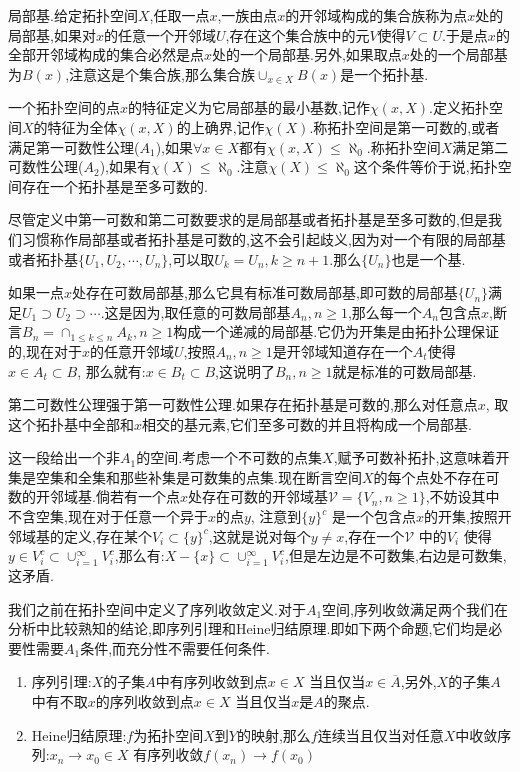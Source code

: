 局部基.给定拓扑空间$X$,任取一点$x$,一族由点$x$的开邻域构成的集合族称为点$x$处的局部基,如果对$x$的任意一个开邻域$U$,存在这个集合族中的元$V$使得$V\subset U$.于是点$x$的全部开邻域构成的集合必然是点$x$处的一个局部基.另外,如果取点$x$处的一个局部基为$B(x)$,注意这是个集合族,那么集合族$\cup_{x\in X}B(x)$是一个拓扑基.

一个拓扑空间的点$x$的特征定义为它局部基的最小基数,记作$\chi(x,X)$.定义拓扑空间$X$的特征为全体$\chi(x,X)$的上确界,记作$\chi(X)$.称拓扑空间是第一可数的,或者满足第一可数性公理($A_1$),如果$\forall x\in X$都有$\chi(x,X)\le\aleph_0$.称拓扑空间$X$满足第二可数性公理($A_2$),如果有$\chi(X)\le\aleph_0$.注意$\chi(X)\le\aleph_0$这个条件等价于说,拓扑空间存在一个拓扑基是至多可数的.

尽管定义中第一可数和第二可数要求的是局部基或者拓扑基是至多可数的,但是我们习惯称作局部基或者拓扑基是可数的,这不会引起歧义,因为对一个有限的局部基或者拓扑基$\{U_1,U_2,\cdots,U_n\}$,可以取$U_{k}=U_n,k\ge n+1$.那么$\{U_n\}$也是一个基.

如果一点$x$处存在可数局部基,那么它具有标准可数局部基,即可数的局部基$\{U_n\}$满足$U_1\supset U_2\supset\cdots$.这是因为,取任意的可数局部基$A_n,n\ge1$,那么每一个$A_n$包含点$x$,断言$B_n=\cap_ {1\le k\le n}A_k,n\ge1$构成一个递减的局部基.它仍为开集是由拓扑公理保证的,现在对于$x$的任意开邻域$U$,按照$A_n,n\ge1$是开邻域知道存在一个$A_t$使得$x\in A_t\subset B$, 那么就有:$x\in B_t\subset B$,这说明了$B_n,n\ge1$就是标准的可数局部基.

第二可数性公理强于第一可数性公理.如果存在拓扑基是可数的,那么对任意点$x$, 取这个拓扑基中全部和$x$相交的基元素,它们至多可数的并且将构成一个局部基.

这一段给出一个非$A_1$的空间.考虑一个不可数的点集$X$,赋予可数补拓扑,这意味着开集是空集和全集和那些补集是可数集的点集.现在断言空间$X$的每个点处不存在可数的开邻域基.倘若有一个点$x$处存在可数的开邻域基$\mathscr{V}=\{V_n,n\ge1\}$,不妨设其中不含空集,现在对于任意一个异于$x$的点$y$, 注意到$\{y\}^c$ 是一个包含点$x$的开集,按照开邻域基的定义,存在某个$V_i\subset\{y\}^c$,这就是说对每个$y\not=x$,存在一个$\mathscr{V}$ 中的$V_i$ 使得$y\in V_i^c\subset\cup_{i=1}^{\infty}V_i^c$,那么有:$X-\{x\}\subset\cup_{i=1}^{\infty}V_i^c$,但是左边是不可数集,右边是可数集,这矛盾.

我们之前在拓扑空间中定义了序列收敛定义.对于$A_1$空间,序列收敛满足两个我们在分析中比较熟知的结论,即序列引理和Heine归结原理.即如下两个命题,它们均是必要性需要$A_1$条件,而充分性不需要任何条件.
\begin{enumerate}
	\item 序列引理:$X$的子集$A$中有序列收敛到点$x\in X$ 当且仅当$x\in\overline{A}$,另外,$X$的子集$A$中有不取$x$的序列收敛到点$x\in X$ 当且仅当$x$是$A$的聚点.
	\item Heine归结原理:$f$为拓扑空间$X$到$Y$的映射,那么$f$连续当且仅当对任意$X$中收敛序列:$x_n\to x_0\in X$ 有序列收敛$f(x_n)\to f(x_0)$
\end{enumerate}

